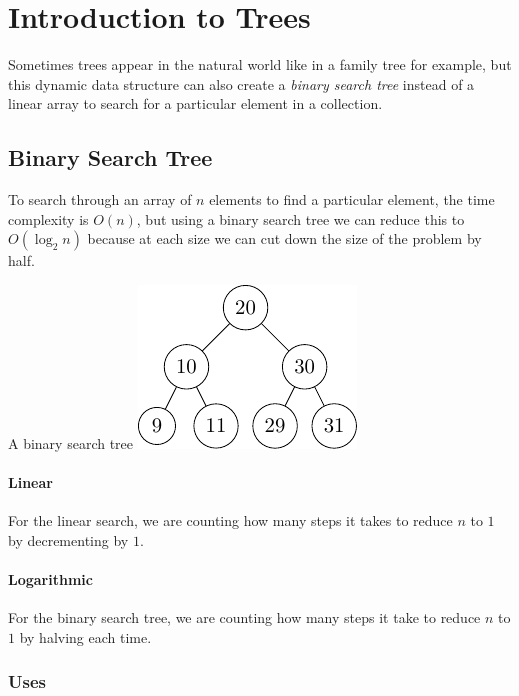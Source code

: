 \section{Introduction to Trees}\label{sec:introduction_to_trees}

Sometimes trees appear in the natural world like in a family tree for example, but this dynamic data structure can also create a \emph{binary search tree} instead of a linear array to search for a particular element in a collection.

\subsection{Binary Search Tree}\label{sub:binary_search_tree}

To search through an array of \(n\) elements to find a particular element, the time complexity is \(O(n)\), but using a binary search tree we can reduce this to \(O(\log_2 n)\) because at each size we can cut down the size of the problem by half.

\begin{highlight}{A binary search tree}
    \includegraphics{lualatex/pa/8/binarysearchtree.pdf}
\end{highlight}

\paragraph{Linear}\label{par:linearbst}

For the linear search, we are counting how many steps it takes to reduce \(n\) to \(1\) by decrementing by \(1\).

\paragraph{Logarithmic}\label{par:logarithmicbst}

For the binary search tree, we are counting how many steps it take to reduce \(n\) to \(1\) by halving each time.

\subsubsection{Uses}\label{ssub:usesbst}

